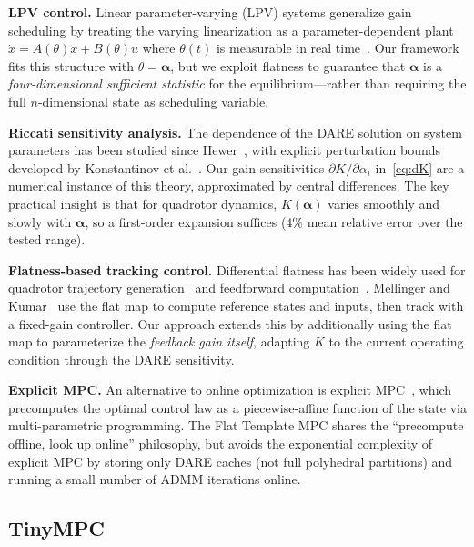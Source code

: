 \documentclass[letterpaper, 10pt, conference]{IEEEtran}
\newcommand{\balpha}{\bm{\alpha}}
\begin{document}
\textbf{LPV control.}
Linear parameter-varying (LPV) systems generalize gain scheduling
by treating the varying linearization as a parameter-dependent
plant $\dot{x} = A(\theta) x + B(\theta) u$ where $\theta(t)$
is measurable in real time~\cite{shamma1991}.
Our framework fits this structure with $\theta = \balpha$,
but we exploit flatness to guarantee that $\balpha$ is a
\emph{four-dimensional sufficient statistic} for the
equilibrium---rather than requiring the full $n$-dimensional
state as scheduling variable.

\textbf{Riccati sensitivity analysis.}
The dependence of the DARE solution on system parameters has been
studied since Hewer~\cite{hewer1971}, with explicit perturbation
bounds developed by Konstantinov et al.~\cite{konstantinov1993}.
Our gain sensitivities $\partial K / \partial \alpha_i$
in~\eqref{eq:dK} are a numerical instance of this theory,
approximated by central differences.
The key practical insight is that for quadrotor dynamics,
$K(\balpha)$ varies smoothly and slowly with $\balpha$,
so a first-order expansion suffices (4\% mean relative error
over the tested range).

\textbf{Flatness-based tracking control.}
Differential flatness has been widely used for quadrotor
trajectory generation~\cite{mellinger2011,mueller2015} and
feedforward computation~\cite{faessler2018}.
Mellinger and Kumar~\cite{mellinger2011} use the flat map to
compute reference states and inputs, then track with a fixed-gain
controller.
Our approach extends this by additionally using the flat map
to parameterize the \emph{feedback gain itself},
adapting $K$ to the current operating condition through
the DARE sensitivity.

\textbf{Explicit MPC.}
An alternative to online optimization is explicit MPC~\cite{bemporad2002},
which precomputes the optimal control law as a piecewise-affine
function of the state via multi-parametric programming.
The Flat Template MPC shares the ``precompute offline, look up online''
philosophy, but avoids the exponential complexity of explicit MPC
by storing only DARE caches (not full polyhedral partitions)
and running a small number of ADMM iterations online.

\subsection{TinyMPC}\label{sec:tinympc_background}
\end{document}
